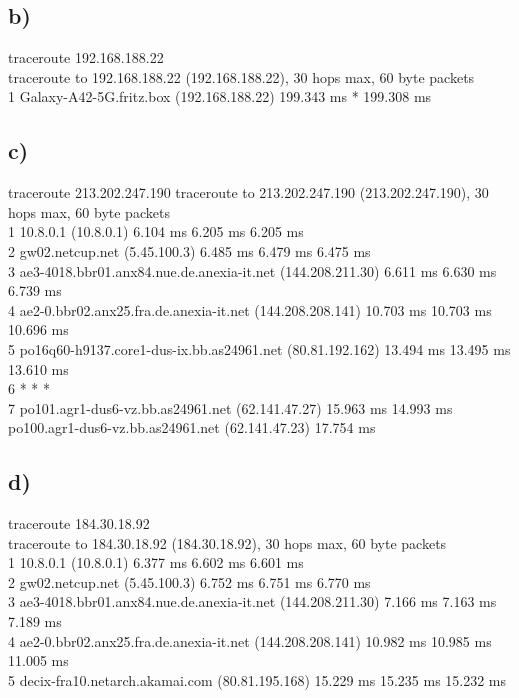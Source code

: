\documentclass{article}
\begin{document}
	\subsection*{b)}
	traceroute 192.168.188.22 \\
	traceroute to 192.168.188.22 (192.168.188.22), 30 hops max, 60 byte packets \\
	1  Galaxy-A42-5G.fritz.box (192.168.188.22)  199.343 ms *  199.308 ms
	
	\subsection*{c)}
	traceroute 213.202.247.190
	traceroute to 213.202.247.190 (213.202.247.190), 30 hops max, 60 byte packets \\
	1  10.8.0.1 (10.8.0.1)  6.104 ms  6.205 ms  6.205 ms \\
	2  gw02.netcup.net (5.45.100.3)  6.485 ms  6.479 ms  6.475 ms \\
	3  ae3-4018.bbr01.anx84.nue.de.anexia-it.net (144.208.211.30)  6.611 ms  6.630 ms  6.739 ms \\
	4  ae2-0.bbr02.anx25.fra.de.anexia-it.net (144.208.208.141)  10.703 ms  10.703 ms  10.696 ms \\
	5  po16q60-h9137.core1-dus-ix.bb.as24961.net (80.81.192.162)  13.494 ms  13.495 ms  13.610 ms \\
	6  * * * \\
	7  po101.agr1-dus6-vz.bb.as24961.net (62.141.47.27)  15.963 ms  14.993 ms po100.agr1-dus6-vz.bb.as24961.net (62.141.47.23)  17.754 ms
	
	\subsection*{d)}
	traceroute 184.30.18.92 \\
	traceroute to 184.30.18.92 (184.30.18.92), 30 hops max, 60 byte packets \\
	1  10.8.0.1 (10.8.0.1)  6.377 ms  6.602 ms  6.601 ms \\
	2  gw02.netcup.net (5.45.100.3)  6.752 ms  6.751 ms  6.770 ms \\
	3  ae3-4018.bbr01.anx84.nue.de.anexia-it.net (144.208.211.30)  7.166 ms  7.163 ms  7.189 ms \\
	4  ae2-0.bbr02.anx25.fra.de.anexia-it.net (144.208.208.141)  10.982 ms  10.985 ms  11.005 ms \\
	5  decix-fra10.netarch.akamai.com (80.81.195.168)  15.229 ms  15.235 ms  15.232 ms \\
	
\end{document}
